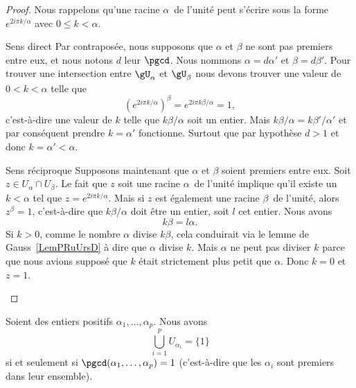 \begin{proof}
	Nous rappelons qu'une racine \( \alpha\)\ieme\ de l'unité peut s'écrire sous la forme \( e^{2i\pi k/\alpha}\) avec \( 0\leq k<\alpha\).
	\begin{subproof}
		\item[Sens direct]
		Par contraposée, nous supposons que \( \alpha\) et \( \beta\) ne sont pas premiers entre eux, et nous notons \( d\) leur \( \pgcd\). Nous nommons \( \alpha=d\alpha'\) et \( \beta=d\beta'\). Pour trouver une intersection entre \( \gU_{\alpha}\) et \( \gU_{\beta}\) nous devons trouver une valeur de \( 0<k<\alpha\) telle que
		\begin{equation}
			( e^{2i\pi k/\alpha})^{\beta}= e^{2i\pi k\beta/\alpha}=1,
		\end{equation}
		c'est-à-dire une valeur de \( k\) telle que \( k\beta/\alpha\) soit un entier. Mais \( k\beta/\alpha=k\beta'/\alpha'\) et par conséquent prendre \( k=\alpha'\) fonctionne. Surtout que par hypothèse \( d>1\) et donc \( k=\alpha'<\alpha\).
		\item[Sens réciproque]
		Supposons maintenant que \( \alpha\) et \( \beta \) soient premiers entre eux. Soit \( z\in U_{\alpha}\cap U_{\beta}\). Le fait que \( z\) soit une racine \( \alpha\)\ieme\ de l'unité implique qu'il existe un \( k<\alpha\) tel que \( z= e^{2i\pi k/\alpha}\). Mais si \( z\) est également une racine \( \beta\)\ieme\ de l'unité, alors \( z^{\beta}=1\), c'est-à-dire que \( k\beta/\alpha\) doit être un entier, soit \( l\) cet entier. Nous avons
		\begin{equation}
			k\beta=l\alpha.
		\end{equation}
		Si \( k>0\), comme le nombre \( \alpha\) divise \( k\beta\), cela conduirait via le lemme de Gauss~\ref{LemPRuUrsD} à dire que \( \alpha\) divise \( k\). Mais \( \alpha\) ne peut pas diviser \( k\) parce que nous avions supposé que \( k\) était strictement plus petit que \( \alpha\). Donc \( k = 0\) et \( z = 1\).
	\end{subproof}
\end{proof}

\begin{proposition}   \label{PropFDDHooEyYxBC}
	Soient des entiers positifs \( \alpha_1,\ldots, \alpha_p\). Nous avons
	\begin{equation}
		\bigcup_{i=1}^p U_{\alpha_i}=\{ 1 \}
	\end{equation}
	si et seulement si \( \pgcd(\alpha_1,\ldots, \alpha_p)=1\) (c'est-à-dire que les \( \alpha_i\) sont premiers dans leur ensemble).
\end{proposition}

